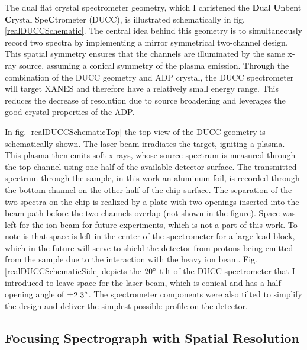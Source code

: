 The dual flat crystal spectrometer geometry, which I 
christened the \textbf{D}ual 
\textbf{U}nbent \textbf{C}rystal 
Spe\textbf{C}trometer (DUCC), is illustrated 
schematically in fig. \ref{realDUCCSchematic}. The 
central idea behind this 
geometry is to simultaneously record two spectra by 
implementing a mirror 
symmetrical two-channel design. This spatial symmetry 
ensures that the channels 
are illuminated by the same x-ray source, assuming a conical symmetry of the 
plasma emission. Through the combination of the DUCC geometry and ADP 
crystal, the DUCC spectrometer will target XANES and therefore 
have a relatively small energy range. This reduces the decrease of resolution due to source broadening and leverages the good crystal properties of the ADP.

In fig. \ref{realDUCCSchematicTop} the top view of 
the DUCC geometry is schematically shown. The laser beam 
irradiates the target, 
igniting a plasma. This plasma then emits soft x-rays, 
whose source spectrum is 
measured through the top channel using one half of the 
available detector 
surface. The transmitted 
spectrum through the sample, 
in this work an aluminum foil, is recorded through the 
bottom channel on the 
other half of the chip surface. The separation of the 
two spectra on the chip 
is realized by a plate with two openings inserted into 
the beam path before the 
two channels overlap (not shown in the figure). Space was 
left for the ion beam for 
future experiments, which 
is not a part of this work. To note is that 
space is left in the 
center of the spectrometer for a large lead block, which 
in the future will 
serve to shield the detector from protons being emitted from the sample due to the 
interaction with the heavy ion beam. Fig. 
\ref{realDUCCSchematicSide} depicts the $20\degree$ tilt 
of the DUCC spectrometer that I 
introduced to leave space for the laser beam, 
which is conical and has a half opening angle 
of $\pm 2.3\degree$. 
The 
spectrometer components 
were also tilted to simplify the design and deliver the 
simplest possible 
profile on the detector.




\subsection{Focusing Spectrograph with Spatial 
Resolution}

